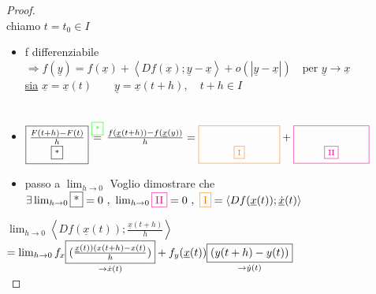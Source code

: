 \documentclass[a4paper, oneside]{article}
\newcommand\bulletout  {\labelitemfont \textbullet}
\begin{document}
        \begin{proof}
            \hfil\\
            chiamo $t = t_0 \in I$\\
            \begin{itemize}
                \item f differenziabile $\Rightarrow f(\underline{y}) = f(\underline{x}) + \left\langle Df (\underline{x}); \underline{y}- \underline{x} \right\rangle + o(\left\lvert \underline{y} - \underline{x} \right\rvert) \quad \text{per } \underline{y} \to \underline{x}$\\
                \underline{sia} $\underline{x} = \underline{x}(t) \qquad \underline{y} = \underline{x}(t+h), \quad t+h \in I$\\
                \textcolor{green}{}  \textcolor{green}{\fbox{*}}\\
                \item $\text{\fbox{$\underset{\text{\fbox{*}}}{\frac{F(t+h)-F(t)}{h}}$}} \overset{\text{\textcolor{green}{\fbox{*}}}}{=} \frac{f(\underline{x}(t+h))-f(\underline{x}(y))}{h} = \textcolor{orange}{\text{\fbox{\textcolor{white}{$\underset{\textcolor{orange}{\text{\fbox{I}}}}{\frac{\left\langle Df(\underline{x}(t));\underline{x}(t+h)\right\rangle }{h}}$}}}} + \textcolor{magenta}{\text{\fbox{$\textcolor{white}{\underset{\text{\textcolor{magenta}{\fbox{II}}}}{\frac{o(\left\lvert \underline{x}(t+h) -\underline{x}(t)\right\rvert )}{h}}}$}}}$ \\
                \item passo a $\lim_{h \to 0}$ Voglio dimostrare che $\exists \lim_{h \to 0} \text{\fbox{*}} = 0 \ , \ \lim_{h \to 0} \text{\textcolor{magenta}{\fbox{II}}} = 0 \ , \ \text{\textcolor{orange}{\fbox{I}}} = \left\langle Df(\underline{x}(t));\underline{\dot{x}}(t) \right\rangle $
            \end{itemize}
            \bulletout\textcolor{orange}{} $\lim_{h \to 0} \left\langle Df(\underline{x}(t));\frac{\underline{x}(t+h)}{h}\right\rangle$\\
            $=\lim_{h \to 0} f_x \underset{\to \dot{x}(t)}{\text{\fbox{$(\frac{ \underline{x}(t))(x(t+h)-x(t)}{h})$}}} + f_y(\underline{x}(t))\underset{\to \dot{y}(t)}{\text{\fbox{$(y(t+h)-y(t))$}}}$\\

\end{proof}
\end{document}
